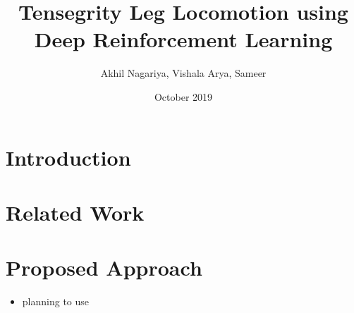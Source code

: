 \documentclass[a4paper,10pt]{article}
\title{Tensegrity Leg Locomotion using Deep Reinforcement Learning}
\author{Akhil Nagariya, Vishala Arya, Sameer}
\date{October 2019}
\begin{document}
\maketitle
  \section{Introduction}
  \section{Related Work}
  \section{Proposed Approach}
  \begin{itemize}
    \item planning to use \cite{DBLP:journals/corr/MontgomeryL16}
  \end{itemize}
  \cite{gps}
  \cite{vps}
  \cite{2014-cgps}
  \cite{DBLP:journals/corr/LevineFDA15}
  \cite{DBLP:journals/corr/MontgomeryL16}
  \cite{DBLP:journals/corr/GengZBCVSAL16}
   
  
\end{document}
